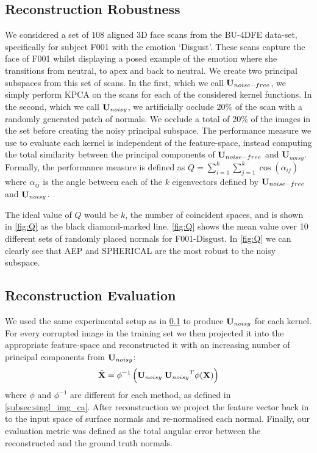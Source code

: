 \subsection{Reconstruction Robustness}\label{subsec:Q}
We considered a set of $108$ aligned 3D face scans from the BU-4DFE data-set, 
specifically for subject F001 with the emotion `Disgust'. These scans capture 
the face of F001 whilst displaying a posed example of the emotion where she 
transitions from neutral, to apex and back to neutral. We create two principal 
subspaces from this set of scans. In the first, which we call 
$\boldsymbol{\mathbf{U}}_{noise-free}$, we simply perform KPCA on the scans for each of 
the considered kernel functions. In the second, which we call 
$\boldsymbol{\mathbf{U}}_{noisy}$, we artificially occlude 20\% of the scan with a 
randomly generated patch of normals. We occlude a total of 20\% of the images 
in the set before creating the noisy principal subspace. The performance 
measure we use to evaluate each kernel is independent of the feature-space, 
instead computing the total similarity between the principal components of 
$\boldsymbol{\mathbf{U}}_{noise-free}$ and $\boldsymbol{U}_{noisy}$. Formally, the 
performance measure is defined as 
$Q = \sum_{i=1}^k \sum_{j=1}^k \cos(\alpha_{ij})$ where $\alpha_{ij}$ is the 
angle between each of the $k$ eigenvectors defined by
 $\boldsymbol{\mathbf{U}}_{noise-free}$ and $\boldsymbol{\mathbf{U}}_{noisy}$. 

The ideal value of $Q$ would be $k$, the number of coincident spaces, and is 
shown in \cref{fig:Q} as the black diamond-marked line. \cref{fig:Q} 
shows the mean value over 10 different sets of randomly placed normals for
F001-Disgust. In \cref{fig:Q} we can clearly see that AEP and SPHERICAL 
are the most robust to the noisy subspace.
\subsection{Reconstruction Evaluation}
We used the same experimental setup as in \cref{subsec:Q} to produce 
$\boldsymbol{\mathbf{U}}_{noisy}$ for each kernel. For every corrupted image in the 
training set we then projected it into the appropriate feature-space and 
reconstructed it with an increasing number of principal components from
 $\boldsymbol{\mathbf{U}}_{noisy}$:
\begin{equation}\label{eq:xtilde}
    \tilde{\boldsymbol{\mathbf{X}}} = \phi^{-1} \left( \boldsymbol{\mathbf{U}}_{noisy} \; {\boldsymbol{\mathbf{U}}_{noisy}}^T \phi(\boldsymbol{\mathbf{X}}) \right)
\end{equation}
where $\phi$ and $\phi^{-1}$ are different for each method, as defined in 
\cref{subsec:singl_img_ca}. After reconstruction we project the 
feature vector back in to the input space of surface normals and re-normalised 
each normal. Finally, our evaluation metric was defined as the total angular
 error between the reconstructed and the ground truth normals.

